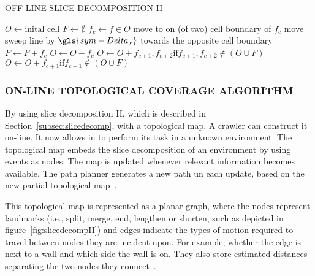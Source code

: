 \begin{RoyalAlgorithm}[label=alg:offlineslicedecompositionII]{OFF-LINE SLICE DECOMPOSITION II}
    \begin{algorithmic}[1]
            \State $ O \gets \text{inital cell} $
            \State $ F \gets \emptyset $
                \State $f_c \gets f \in O $
                \State move to on (of two) cell boundary of $ f_c $
                \Repeat
                    \State move sweep line by $ \gls{sym-Delta_x}  $ towards the opposite cell boundary
                        \State $ F \gets F + f_c $
                        \State $ O \gets O - f_c $
                            \State $ O \gets O + f_{c+1},f_{c+2} \text{if} f_{c+1},f_{c+2} \notin (O \cup F) $
                        \EndIf
                            \State $ O \gets O + f_{c+1} \text{if} f_{c+1} \notin (O \cup F) $
                        \EndIf
                    \EndIf
            \EndWhile
        \EndProcedure
    \end{algorithmic}
\end{RoyalAlgorithm}

\subsubsection{ON-LINE TOPOLOGICAL COVERAGE ALGORITHM}
By using slice decomposition II, which is described in Section~\ref{subsec:slicedecomp}, with a topological map. A
crawler can construct it on-line. It now allows in to perform its task in a unknown environment. The topological map
embeds the slice decomposition of an environment by using events as nodes. The map is updated whenever relevant
information becomes available. The path planner generates a new path un each update, based on the new partial
topological map~\cite{wong_qualitative_2006}.

This topological map is represented as a planar graph, where the nodes represent landmarks (i.e., split, merge, end,
lengthen or shorten, such as depicted in figure~\ref{fig:slicedecompII}) and edges indicate the types of motion required
to travel between nodes they are incident upon. For example, whether the edge is next to a wall and which side the wall
is on. They also store estimated distances separating the two nodes they connect~\cite{galceran_coverage_2012}.

